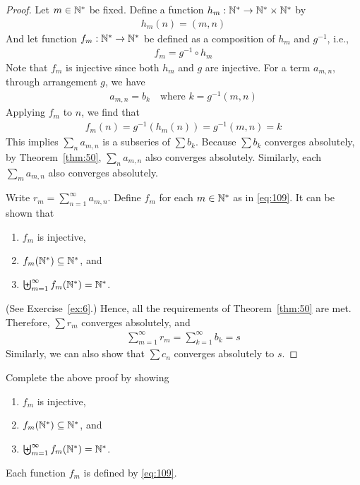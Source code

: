 \documentclass[thmcnt=section, 12pt]{my-elegantbook}
\begin{document}
\begin{proof}
    Let $m \in \mathbb{N}^\ast$ be fixed. Define a function $h_m: \mathbb{N}^\ast \to \mathbb{N}^\ast \times \mathbb{N}^\ast$ by
    \begin{align*}
        h_m(n) = (m, n)
    \end{align*}
    And let function $f_m: \mathbb{N}^\ast \to \mathbb{N}^\ast$ be defined as a composition of $h_m$ and $g^{-1}$, i.e.,
    \begin{align}
        f_m = g^{-1} \circ h_m
        \label{eq:109}
    \end{align}
    Note that $f_m$ is injective since both $h_m$ and $g$ are injective. For a term $a_{m,n}$, through arrangement $g$, we have
    \begin{align*}
        a_{m,n} = b_k
        \quad \text{where $k = g^{-1}(m,n)$}
    \end{align*}
    Applying $f_m$ to $n$, we find that
    \begin{align*}
        f_m(n) = g^{-1}( h_m(n) )
        = g^{-1}(m, n)
        = k
    \end{align*}
    This implies $\sum_n a_{m,n}$ is a subseries of $\sum b_k$. Because $\sum b_k$ converges absolutely, by Theorem~\ref{thm:50}, $\sum_n a_{m,n}$ also converges absolutely. Similarly, each $\sum_m a_{m,n}$ also converges absolutely.

    Write $r_m = \sum_{n=1}^\infty a_{m,n}$. Define $f_m$ for each $m \in \mathbb{N}^\ast$ as in \eqref{eq:109}. It can be shown that
    \begin{enumerate}
        \item $f_m$ is injective,
        \item $f_m(\mathbb{N}^\ast) \subseteq \mathbb{N}^\ast$, and
        \item $\biguplus_{m=1}^\infty f_m(\mathbb{N}^\ast) = \mathbb{N}^\ast$.
    \end{enumerate}
    (See Exercise~\ref{ex:6}.) Hence, all the requirements of Theorem~\ref{thm:50} are met. Therefore, $\sum r_m$ converges absolutely, and
    \begin{align*}
        \sum_{m=1}^\infty r_m
        = \sum_{k=1}^\infty b_k
        = s
    \end{align*}
    Similarly, we can also show that $\sum c_n$ converges absolutely to $s$.
\end{proof}

\begin{exercise}
    Complete the above proof by showing
    \begin{enumerate}
        \item $f_m$ is injective,
        \item $f_m(\mathbb{N}^\ast) \subseteq \mathbb{N}^\ast$, and
        \item $\biguplus_{m=1}^\infty f_m(\mathbb{N}^\ast) = \mathbb{N}^\ast$.
    \end{enumerate}
    Each function $f_m$ is defined by \eqref{eq:109}.
    \label{ex:6}
\end{exercise}
\end{document}

